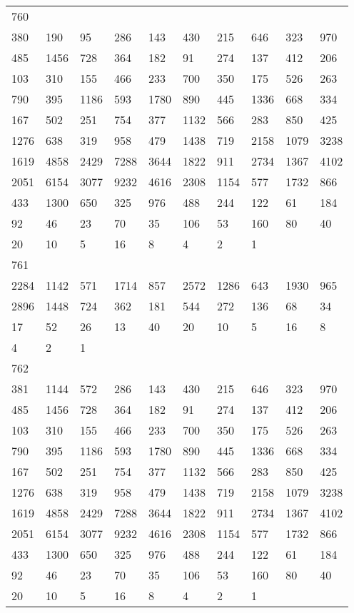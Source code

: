 \begin{longtable}{*{10}{l}}
760&&&&&&&&&\\
380& 190& 95& 286& 143& 430& 215& 646& 323& 970\\
485& 1456& 728& 364& 182& 91& 274& 137& 412& 206\\
103& 310& 155& 466& 233& 700& 350& 175& 526& 263\\
790& 395& 1186& 593& 1780& 890& 445& 1336& 668& 334\\
167& 502& 251& 754& 377& 1132& 566& 283& 850& 425\\
1276& 638& 319& 958& 479& 1438& 719& 2158& 1079& 3238\\
1619& 4858& 2429& 7288& 3644& 1822& 911& 2734& 1367& 4102\\
2051& 6154& 3077& 9232& 4616& 2308& 1154& 577& 1732& 866\\
433& 1300& 650& 325& 976& 488& 244& 122& 61& 184\\
92& 46& 23& 70& 35& 106& 53& 160& 80& 40\\
20& 10& 5& 16& 8& 4& 2& 1& \\

761&&&&&&&&&\\
2284& 1142& 571& 1714& 857& 2572& 1286& 643& 1930& 965\\
2896& 1448& 724& 362& 181& 544& 272& 136& 68& 34\\
17& 52& 26& 13& 40& 20& 10& 5& 16& 8\\
4& 2& 1& \\

762&&&&&&&&&\\
381& 1144& 572& 286& 143& 430& 215& 646& 323& 970\\
485& 1456& 728& 364& 182& 91& 274& 137& 412& 206\\
103& 310& 155& 466& 233& 700& 350& 175& 526& 263\\
790& 395& 1186& 593& 1780& 890& 445& 1336& 668& 334\\
167& 502& 251& 754& 377& 1132& 566& 283& 850& 425\\
1276& 638& 319& 958& 479& 1438& 719& 2158& 1079& 3238\\
1619& 4858& 2429& 7288& 3644& 1822& 911& 2734& 1367& 4102\\
2051& 6154& 3077& 9232& 4616& 2308& 1154& 577& 1732& 866\\
433& 1300& 650& 325& 976& 488& 244& 122& 61& 184\\
92& 46& 23& 70& 35& 106& 53& 160& 80& 40\\
20& 10& 5& 16& 8& 4& 2& 1& \\


\end{longtable}
